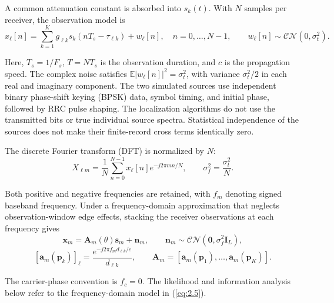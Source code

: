 \documentclass[11pt,a4paper]{article}
\numberwithin{equation}{section}
\numberwithin{figure}{section}
\numberwithin{table}{section}
\begin{document}
A common attenuation constant is absorbed into $s_k(t)$. With $N$ samples per receiver, the observation model is
\begin{equation}\label{eq:2.3}
x_\ell[n] =\sum_{k=1}^{K}g_{\ell k} s_k(nT_s-\tau_{\ell k})+w_\ell[n], \quad n=0,\ldots,N-1, \qquad w_\ell[n]\sim\mathcal{CN}(0,\sigma_t^2).
\end{equation}

Here, $T_s=1/F_s$, $T=NT_s$ is the observation duration, and $c$ is the propagation speed. The complex noise satisfies $\mathbb{E}|w_\ell[n]|^2=\sigma_t^2$, with variance $\sigma_t^2/2$ in each real and imaginary component. The two simulated sources use independent binary phase-shift keying (BPSK) data, symbol timing, and initial phase, followed by RRC pulse shaping. The localization algorithms do not use the transmitted bits or true individual source spectra. Statistical independence of the sources does not make their finite-record cross terms identically zero.

The discrete Fourier transform (DFT) is normalized by $N$:
\begin{equation}\label{eq:2.4}
X_{\ell m} =\frac{1}{N}\sum_{n=0}^{N-1}x_\ell[n]e^{-j2\pi mn/N}, \qquad \sigma_f^2=\frac{\sigma_t^2}{N}.
\end{equation}

\begin{samepage}
Both positive and negative frequencies are retained, with $f_m$ denoting signed baseband frequency. Under a frequency-domain approximation that neglects observation-window edge effects\cite{ref04,ref05}, stacking the receiver observations at each frequency gives
\begin{equation}\label{eq:2.5}
\mathbf{x}_m =\mathbf{A}_m(\theta)\mathbf{s}_m +\mathbf{n}_m, \qquad \mathbf{n}_m\sim\mathcal{CN}(\mathbf{0},\sigma_f^2\mathbf{I}_L),
\end{equation}
\begin{equation}\label{eq:2.6}
[\mathbf{a}_m(\mathbf{p}_k)]_\ell =\frac{e^{-j2\pi f_m d_{\ell k}/c}}{d_{\ell k}}, \qquad \mathbf{A}_m=[\mathbf{a}_m(\mathbf{p}_1),\ldots,\mathbf{a}_m(\mathbf{p}_K)].
\end{equation}
\end{samepage}

The carrier-phase convention is $f_c=0$. The likelihood and information analysis below refer to the frequency-domain model in (\ref{eq:2.5}).
\end{document}
